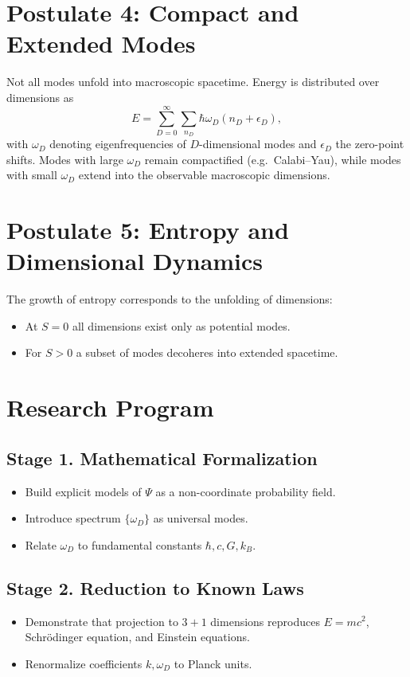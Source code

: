 \documentclass[12pt,a4paper]{article}
\begin{document}
\section{Postulate 4: Compact and Extended Modes}
Not all modes unfold into macroscopic spacetime. Energy is distributed over dimensions as
\[
E = \sum_{D=0}^{\infty} \sum_{n_D} \hbar \omega_D \left(n_D + \epsilon_D\right),
\]
with $\omega_D$ denoting eigenfrequencies of $D$-dimensional modes and $\epsilon_D$ the zero-point shifts.
Modes with large $\omega_D$ remain compactified (e.g.\ Calabi--Yau), while modes with small $\omega_D$ extend into the observable macroscopic dimensions.

\section{Postulate 5: Entropy and Dimensional Dynamics}
The growth of entropy corresponds to the unfolding of dimensions:
\begin{itemize}
  \item At $S=0$ all dimensions exist only as potential modes.
  \item For $S>0$ a subset of modes decoheres into extended spacetime.
\end{itemize}

\section{Research Program}
\subsection*{Stage 1. Mathematical Formalization}
\begin{itemize}
  \item Build explicit models of $\Psi$ as a non-coordinate probability field.
  \item Introduce spectrum $\{\omega_D\}$ as universal modes.
  \item Relate $\omega_D$ to fundamental constants $\hbar, c, G, k_B$.
\end{itemize}

\subsection*{Stage 2. Reduction to Known Laws}
\begin{itemize}
  \item Demonstrate that projection to $3+1$ dimensions reproduces
        $E = mc^2$, Schrödinger equation, and Einstein equations.
  \item Renormalize coefficients $k, \omega_D$ to Planck units.
\end{itemize}
\end{document}
